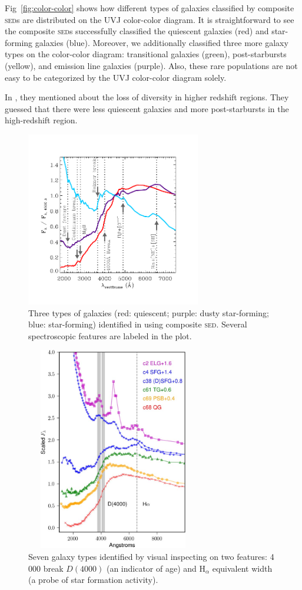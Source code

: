 \documentclass{ar-1col}
\begin{document}
Fig~\ref{fig:color-color} shows how different types of galaxies classified by composite \textsc{sed}s are distributed on the UVJ color-color diagram.
It is straightforward to see the composite \textsc{sed}s successfully classified the quiescent galaxies (red) and star-forming galaxies (blue).
Moreover, we additionally classified three more galaxy types on the color-color diagram: transitional galaxies (green), post-starbursts (yellow), and emission line galaxies (purple).
Also, these rare populations are not easy to be categorized by the UVJ color-color diagram solely.

In \citet{Forrest2018}, they mentioned about the loss of diversity in higher redshift regions. 
They guessed that there were less quiescent galaxies and more post-starbursts in the high-redshift region.


\begin{figure}
    \includegraphics[width=3in, height=3in]{images/spectral_features.pdf}
    \caption{Three types of galaxies (red: quiescent; purple: dusty star-forming; blue: star-forming) identified in \citet{Kriek2011} using composite \textsc{sed}. Several spectroscopic features are labeled in the plot.}
    \label{fig:kreiksed}
\end{figure}

\begin{figure}
    \includegraphics[width=3in, height=3.5in]{images/galaxy_types.png}
    \caption{Seven galaxy types identified by visual inspecting on two features: 4\,000 break $ D(4000) $ (an indicator of age) and H$_\alpha$ equivalent width (a probe of star formation activity).}
    \label{fig:seds}
\end{figure}
\end{document}
